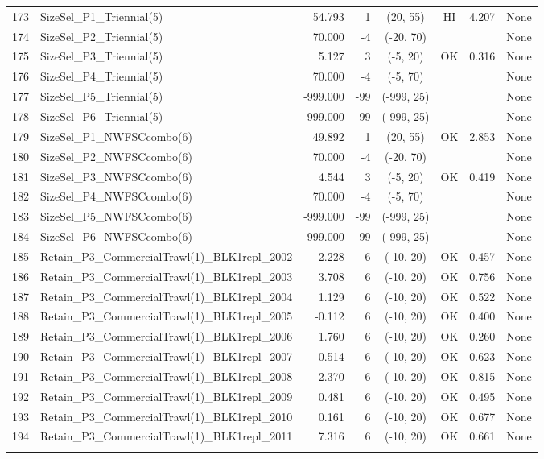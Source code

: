 \documentclass[12pt,]{article}
\begin{document}
\begin{landscape}
\begin{longtable}{rlrrcccl}
  173 & SizeSel\_P1\_Triennial(5) & 54.793 & 1 & (20, 55) & HI & 4.207 & None \\ 
  174 & SizeSel\_P2\_Triennial(5) & 70.000 & -4 & (-20, 70) &  &  & None \\ 
  175 & SizeSel\_P3\_Triennial(5) & 5.127 & 3 & (-5, 20) & OK & 0.316 & None \\ 
  176 & SizeSel\_P4\_Triennial(5) & 70.000 & -4 & (-5, 70) &  &  & None \\ 
  177 & SizeSel\_P5\_Triennial(5) & -999.000 & -99 & (-999, 25) &  &  & None \\ 
  178 & SizeSel\_P6\_Triennial(5) & -999.000 & -99 & (-999, 25) &  &  & None \\ 
  179 & SizeSel\_P1\_NWFSCcombo(6) & 49.892 & 1 & (20, 55) & OK & 2.853 & None \\ 
  180 & SizeSel\_P2\_NWFSCcombo(6) & 70.000 & -4 & (-20, 70) &  &  & None \\ 
  181 & SizeSel\_P3\_NWFSCcombo(6) & 4.544 & 3 & (-5, 20) & OK & 0.419 & None \\ 
  182 & SizeSel\_P4\_NWFSCcombo(6) & 70.000 & -4 & (-5, 70) &  &  & None \\ 
  183 & SizeSel\_P5\_NWFSCcombo(6) & -999.000 & -99 & (-999, 25) &  &  & None \\ 
  184 & SizeSel\_P6\_NWFSCcombo(6) & -999.000 & -99 & (-999, 25) &  &  & None \\ 
  185 & Retain\_P3\_CommercialTrawl(1)\_BLK1repl\_2002 & 2.228 & 6 & (-10, 20) & OK & 0.457 & None \\ 
  186 & Retain\_P3\_CommercialTrawl(1)\_BLK1repl\_2003 & 3.708 & 6 & (-10, 20) & OK & 0.756 & None \\ 
  187 & Retain\_P3\_CommercialTrawl(1)\_BLK1repl\_2004 & 1.129 & 6 & (-10, 20) & OK & 0.522 & None \\ 
  188 & Retain\_P3\_CommercialTrawl(1)\_BLK1repl\_2005 & -0.112 & 6 & (-10, 20) & OK & 0.400 & None \\ 
  189 & Retain\_P3\_CommercialTrawl(1)\_BLK1repl\_2006 & 1.760 & 6 & (-10, 20) & OK & 0.260 & None \\ 
  190 & Retain\_P3\_CommercialTrawl(1)\_BLK1repl\_2007 & -0.514 & 6 & (-10, 20) & OK & 0.623 & None \\ 
  191 & Retain\_P3\_CommercialTrawl(1)\_BLK1repl\_2008 & 2.370 & 6 & (-10, 20) & OK & 0.815 & None \\ 
  192 & Retain\_P3\_CommercialTrawl(1)\_BLK1repl\_2009 & 0.481 & 6 & (-10, 20) & OK & 0.495 & None \\ 
  193 & Retain\_P3\_CommercialTrawl(1)\_BLK1repl\_2010 & 0.161 & 6 & (-10, 20) & OK & 0.677 & None \\ 
  194 & Retain\_P3\_CommercialTrawl(1)\_BLK1repl\_2011 & 7.316 & 6 & (-10, 20) & OK & 0.661 & None \\ 
   \hline
\hline
\label{tab:Model1_params}
\end{longtable}
\end{landscape}
\end{document}
